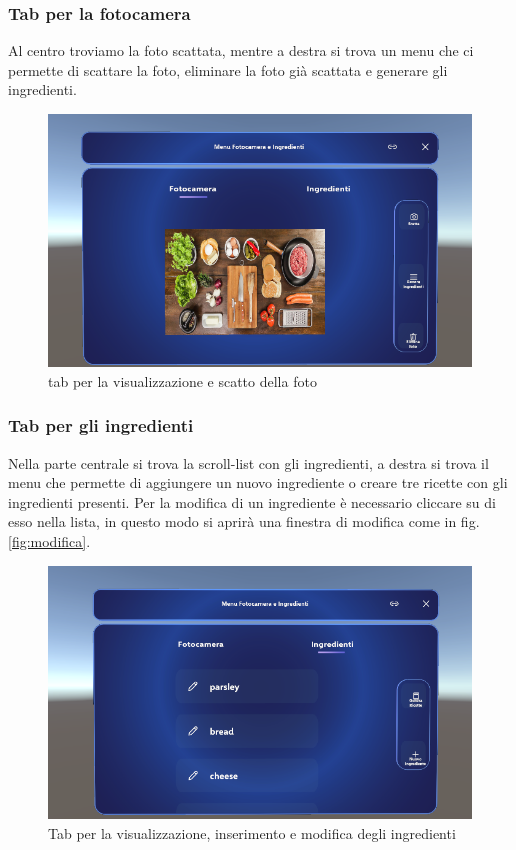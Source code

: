 \subsubsection{Tab per la fotocamera}
Al centro troviamo la foto scattata, mentre a destra si trova un menu che ci permette di scattare la foto, eliminare la foto già scattata e generare gli ingredienti.
\begin{figure}[H]
    \centering
    \includegraphics[width=\textwidth,height=\textheight,keepaspectratio]{figures/chapter_1/FOTOCAMERA_interfaccia.png}
    \caption{tab per la visualizzazione e scatto della foto}
    \label{fig:camera}
\end{figure}

\subsubsection{Tab per gli ingredienti}
Nella parte centrale si trova la scroll-list con gli ingredienti, a destra si trova il menu che permette di aggiungere un nuovo ingrediente o creare tre ricette con gli ingredienti presenti. Per la modifica di un ingrediente è necessario cliccare su di esso nella lista, in questo modo si aprirà una finestra di modifica come in fig.\ref{fig:modifica}.

\begin{figure}[H]
    \centering
    \includegraphics[width=\textwidth,height=\textheight,keepaspectratio]{figures/chapter_1/INGREDIENTI_interfaccia.png}
    \caption{Tab per la visualizzazione, inserimento  e modifica degli ingredienti}
    \label{fig:ingredienti}
\end{figure}

